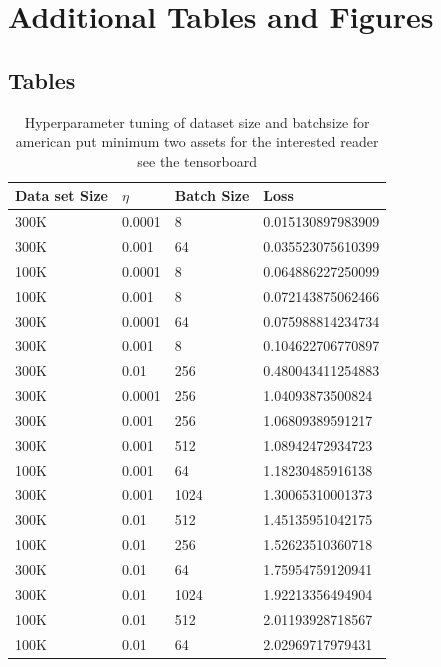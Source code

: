 
\chapter{Additional Tables and Figures} %

\label{AppendixB} %

\section{Tables}
\begin{table}[th]
\caption{Hyperparameter tuning of dataset size and batchsize for american put minimum two assets for the interested reader see the tensorboard}
\label{tab:fullhyperAmerMin4}
\centering
\begin{tabular}{llll}
\toprule
\textbf{Data set Size} & \textbf{$\eta$} & \textbf{Batch Size} & \textbf{Loss} \\
\midrule
300K    & 0.0001 & 8     & 0.015130897983909 \\ 
300K    & 0.001  & 64    & 0.035523075610399 \\ 
100K    & 0.0001 & 8     & 0.064886227250099 \\ 
100K    & 0.001  & 8     & 0.072143875062466 \\ 
300K    & 0.0001 & 64    & 0.075988814234734 \\ 
300K    & 0.001  & 8     & 0.104622706770897 \\ 
300K    & 0.01   & 256   & 0.480043411254883 \\ 
300K    & 0.0001 & 256   & 1.04093873500824  \\ 
300K    & 0.001  & 256   & 1.06809389591217  \\ 
300K    & 0.001  & 512   & 1.08942472934723  \\ 
100K    & 0.001  & 64    & 1.18230485916138  \\ 
300K    & 0.001  & 1024  & 1.30065310001373  \\ 
300K    & 0.01   & 512   & 1.45135951042175  \\ 
100K    & 0.01   & 256   & 1.52623510360718  \\ 
300K    & 0.01   & 64    & 1.75954759120941  \\ 
300K    & 0.01   & 1024  & 1.92213356494904  \\ 
100K    & 0.01   & 512   & 2.01193928718567  \\ 
100K    & 0.01   & 64    & 2.02969717979431  \\ 

\end{tabular}
\end{table}
